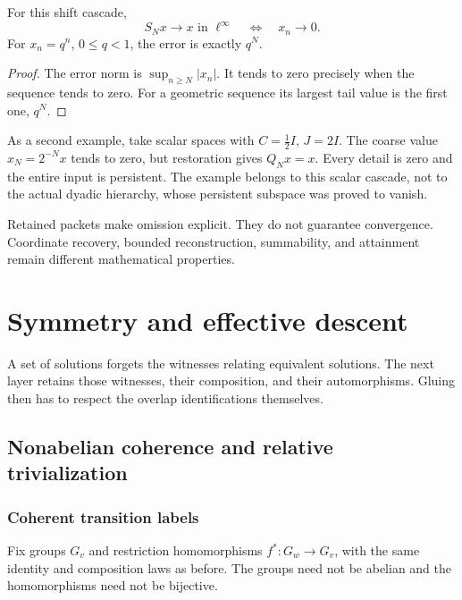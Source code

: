 \begin{KSproposition}\label{KS:KS29}
For this shift cascade,
\[
 S_Nx\to x\text{ in }\ell^\infty
 \quad\Longleftrightarrow\quad x_n\to0.
\]
For \(x_n=q^n\), \(0\le q<1\), the error is exactly \(q^N\).
\end{KSproposition}
\begin{proof}
The error norm is \(\sup_{n\ge N}|x_n|\). It tends to zero precisely when the sequence tends to zero. For a geometric sequence its largest tail value is the first one, \(q^N\).
\end{proof}
As a second example, take scalar spaces with \(C=\tfrac12I\), \(J=2I\). The coarse value \(x_N=2^{-N}x\) tends to zero, but restoration gives \(Q_Nx=x\). Every detail is zero and the entire input is persistent. The example belongs to this scalar cascade, not to the actual dyadic hierarchy, whose persistent subspace was proved to vanish.

\begin{insight}
Retained packets make omission explicit. They do not guarantee convergence. Coordinate recovery, bounded reconstruction, summability, and attainment remain different mathematical properties.
\end{insight}




\chapter{Symmetry and effective descent}\label{KS:book:chapter-21}
A set of solutions forgets the witnesses relating equivalent solutions. The next layer retains those witnesses, their composition, and their automorphisms. Gluing then has to respect the overlap identifications themselves.

\section{Nonabelian coherence and relative trivialization}\label{KS:sec:gauge}
\subsection{Coherent transition labels}
Fix groups \(G_v\) and restriction homomorphisms \(f^*:G_w\to G_v\), with the same identity and composition laws as before. The groups need not be abelian and the homomorphisms need not be bijective.


